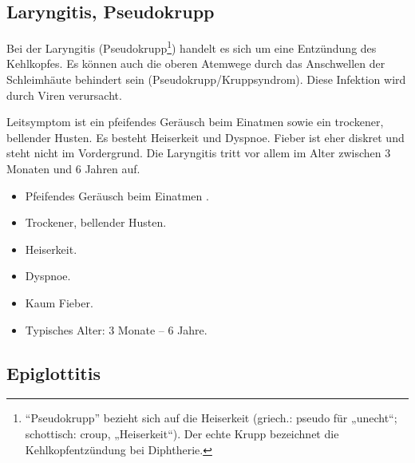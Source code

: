 \subsection{Laryngitis, Pseudokrupp}
\label{topic:laryngitis}
\label{topic:pseudokrupp}


{ Bei der Laryngitis (Pseudokrupp\footnote{"`Pseudokrupp"'
bezieht sich auf die Heiserkeit (griech.: pseudo für „unecht“; schottisch: croup,
„Heiserkeit“\cite{wiki:pseudokrupp}). Der echte Krupp bezeichnet die
Kehlkopfentzündung bei Diphtherie.}) handelt es sich um eine Entzündung des Kehlkopfes. Es können auch die oberen Atemwege durch das Anschwellen der Schleimhäute behindert sein (Pseudokrupp/Kruppsyndrom). Diese
Infektion wird durch Viren verursacht. 
}{
}{}{}{}


{
Leitsymptom ist ein pfeifendes Geräusch beim Einatmen
 sowie ein trockener, bellender Husten. Es besteht Heiserkeit und
Dyspnoe. Fieber ist eher diskret und steht nicht im Vordergrund. Die Laryngitis
tritt vor allem im Alter zwischen 3 Monaten und 6 Jahren auf.
}{
\begin{itemize}
    \item Pfeifendes Geräusch beim Einatmen
    .
    \item Trockener, bellender Husten.
    \item Heiserkeit.
    \item Dyspnoe.
    \item Kaum Fieber.
    \item Typisches Alter: 3 Monate -- 6 Jahre.
\end{itemize}
}{}{}{}





\subsection{Epiglottitis}
\label{topic:epiglottitis}

